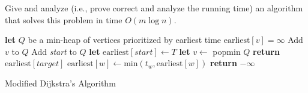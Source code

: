 \documentclass[10pt]{article}
\begin{document}
  Give and analyze (i.e., prove correct and analyze the running time) an algorithm that solves this problem in time $O(m \log n)$.

  \begin{algorithm}[htb]
    \begin{algorithmic}

      \STATE \textbf{let} \(Q\) be a min-heap of vertices prioritized by earliest time
        \STATE \(\text{earliest}[v] = \infty\)
        \STATE Add \(v\) to \(Q\)
      \ENDFOR
      \STATE Add \textit{start} to \(Q\)
      \STATE \textbf{let} \(\text{earliest}[\textit{start}] \gets T\)
        \STATE \textbf{let} \(v \gets\) popmin \(Q\)
          \STATE \textbf{return} \(\text{earliest}[\textit{target}]\)
        \ENDIF 
            \STATE \(\text{earliest}[w] \gets \text{min}(t_w, \text{earliest}[w])\)
          \ENDIF
        \ENDFOR
       \ENDWHILE
      \STATE \textbf{return} \(-\infty\)
    \end{algorithmic}
  \caption{Modified Dijkstra's Algorithm \label{alg:Dijkstra-modified}}
  \end{algorithm}
\end{document}
